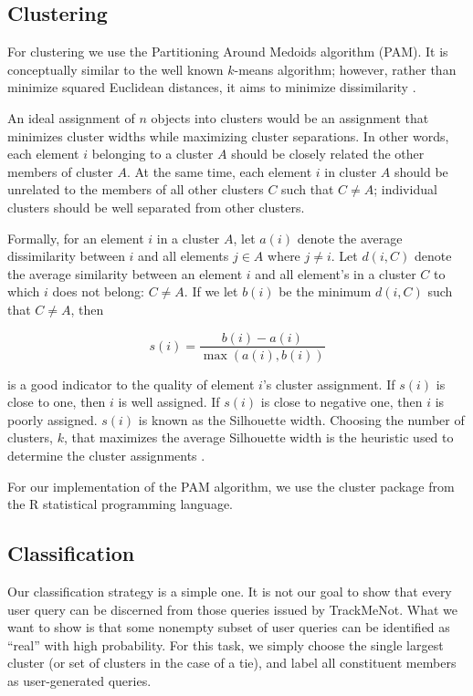 \documentclass{llncs}
\begin{document}
\begin{multicols}{2}
\subsection{Clustering}
\label{sec:clustering}
For clustering we use the Partitioning Around Medoids algorithm
(PAM). It is conceptually similar to the well known $k$-means
algorithm; however, rather than minimize squared Euclidean distances,
it aims to minimize dissimilarity \cite{Kaufmann1990}. 

An ideal assignment of $n$ objects into clusters would be an
assignment that minimizes cluster widths while maximizing cluster
separations. In other words, each element $i$ belonging to a cluster
$A$ should be closely related the other members of cluster $A$. At the
same time, each element $i$ in cluster $A$ should be unrelated to the
members of all other clusters $C$ such that $C \neq A$; individual clusters
should be well separated from other clusters.

Formally, for an element $i$ in a cluster $A$, let $a(i)$ denote the
average dissimilarity between $i$ and all elements $j \in A$ where $j\neq
i$. Let $d(i,C)$ denote the average similarity between an element $i$
and all element's in a cluster $C$ to which $i$ does not belong: $C
\neq A$. If we let $b(i)$ be the minimum $d(i,C)$ such that $C \neq
A$, then

\[ s(i) = \frac{b(i)-a(i)}{\max{(a(i),b(i))}} \]

\noindent is a good indicator to the quality of element $i$'s cluster
assignment. If $s(i)$ is close to one, then $i$ is well assigned. If
$s(i)$ is close to negative one, then $i$ is poorly assigned. $s(i)$
is known as the Silhouette width. Choosing the number of clusters, $k$,
that maximizes the average Silhouette width is the heuristic used to
determine the cluster assignments \cite{Kaufmann1990}.

For our implementation of the PAM algorithm, we use the cluster
package from the R statistical programming language\cite{Rcluster}.

\subsection{Classification}
\label{sec:classification}
Our classification strategy is a simple one. It is not our goal to
show that every user query can be discerned from those queries issued
by TrackMeNot. What we want to show is that some nonempty subset of
user queries can be identified as ``real'' with high probability. For
this task, we simply choose the single largest cluster (or set of
clusters in the case of a tie), and label all constituent members as
user-generated queries.


\end{multicols}
\end{document}
